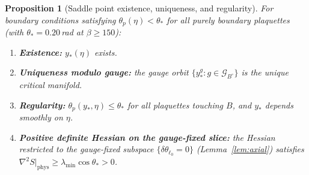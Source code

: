 \documentclass[11pt]{article}
\newtheorem{proposition}[theorem]{Proposition}
\theoremstyle{definition}
\begin{document}
\begin{proposition}[Saddle point existence, uniqueness, and regularity]
\label{prop:saddle}
For boundary conditions satisfying $\theta_p(\eta)<\theta_*$ for all
purely boundary plaquettes (with $\theta_*=0.20$\,rad at $\beta\ge 150$):
\begin{enumerate}[nosep,label=(\roman*)]
\item \textbf{Existence:} $y_*(\eta)$ exists.
\item \textbf{Uniqueness modulo gauge:} the gauge orbit
$\{y_*^g:g\in\mathcal{G}_{B^\circ}\}$ is the unique critical manifold.
\item \textbf{Regularity:} $\theta_p(y_*,\eta)\le\theta_*$ for all
plaquettes touching $B$, and $y_*$ depends smoothly on $\eta$.
\item \textbf{Positive definite Hessian on the gauge-fixed slice:} the Hessian
restricted to the gauge-fixed subspace $\{\delta\theta_{\ell_0}=0\}$
(Lemma~\ref{lem:axial}) satisfies
$\nabla^2 S|_{\mathrm{phys}}\ge\lambda_{\min}\cos\theta_*>0$.
\end{enumerate}
\end{proposition}
\end{document}
